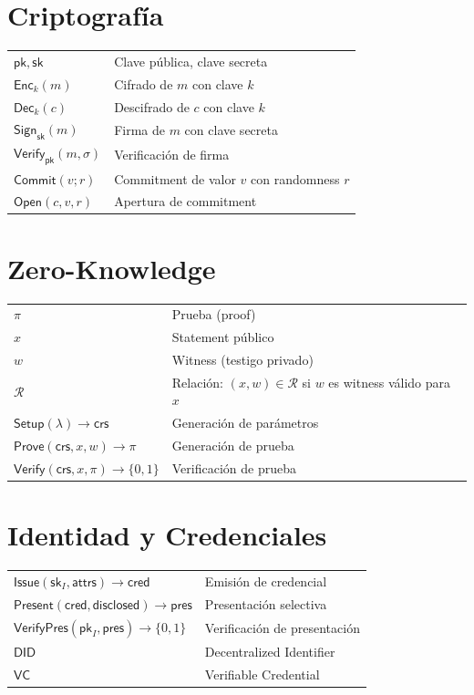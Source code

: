 \documentclass[11pt,a4paper,twoside,openright]{book}
\theoremstyle{definition}
\theoremstyle{plain}
\theoremstyle{remark}
\begin{document}
\section*{Criptografía}
\begin{tabular}{ll}
$\mathsf{pk}, \mathsf{sk}$ & Clave pública, clave secreta \\
$\mathsf{Enc}_k(m)$ & Cifrado de $m$ con clave $k$ \\
$\mathsf{Dec}_k(c)$ & Descifrado de $c$ con clave $k$ \\
$\mathsf{Sign}_{\mathsf{sk}}(m)$ & Firma de $m$ con clave secreta \\
$\mathsf{Verify}_{\mathsf{pk}}(m, \sigma)$ & Verificación de firma \\
$\mathsf{Commit}(v; r)$ & Commitment de valor $v$ con randomness $r$ \\
$\mathsf{Open}(c, v, r)$ & Apertura de commitment \\
\end{tabular}

\section*{Zero-Knowledge}
\begin{tabular}{ll}
$\pi$ & Prueba (proof) \\
$x$ & Statement público \\
$w$ & Witness (testigo privado) \\
$\mathcal{R}$ & Relación: $(x, w) \in \mathcal{R}$ si $w$ es witness válido para $x$ \\
$\mathsf{Setup}(\lambda) \to \mathsf{crs}$ & Generación de parámetros \\
$\mathsf{Prove}(\mathsf{crs}, x, w) \to \pi$ & Generación de prueba \\
$\mathsf{Verify}(\mathsf{crs}, x, \pi) \to \{0, 1\}$ & Verificación de prueba \\
\end{tabular}

\section*{Identidad y Credenciales}
\begin{tabular}{ll}
$\mathsf{Issue}(\mathsf{sk}_I, \mathsf{attrs}) \to \mathsf{cred}$ & Emisión de credencial \\
$\mathsf{Present}(\mathsf{cred}, \mathsf{disclosed}) \to \mathsf{pres}$ & Presentación selectiva \\
$\mathsf{VerifyPres}(\mathsf{pk}_I, \mathsf{pres}) \to \{0, 1\}$ & Verificación de presentación \\
$\mathsf{DID}$ & Decentralized Identifier \\
$\mathsf{VC}$ & Verifiable Credential \\
\end{tabular}
\end{document}
